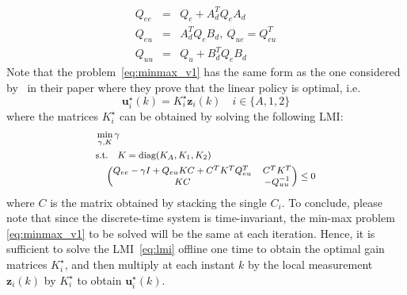 \documentclass{ifacconf}
\begin{document}
\begin{eqnarray}
    Q_{ee} &=& Q_e + A_d^T Q_e A_d \\
    Q_{eu} &=& A_d^T Q_e B_d,\ Q_{ue} = Q^T_{eu} \\
    Q_{uu} &=& Q_u + B_d^T Q_e B_d
\end{eqnarray}
Note that the problem~\eqref{eq:minmax_v1} has the same form as 
the one considered by~\cite{gattami_robust_2012} in their paper
where they prove that the linear policy is optimal, i.e.
\begin{equation}
    \boldsymbol{u}^\star_{i}(k) = K^\star_i \boldsymbol{z}_{i}(k) \quad i \in \{A,1,2\} 
\end{equation}
where the matrices $K^\star_i$ can be obtained by solving 
the following LMI:
\begin{equation}
    \small
    \begin{split}
        &\min_{\gamma , K} \gamma \\
        &\text{s.t.} \quad K = \text{diag}(K_A, K_1, K_2) \\
        &\quad \left(
            \begin{matrix}
                Q_{ee} - \gamma I + Q_{eu} K C + C^T K^T Q_{eu}^T & C^T K^T \\
                KC & -Q_{uu}^{-1}
            \end{matrix}
        \right) \leq 0
    \end{split}
    \label{eq:lmi}
\end{equation}
where $C$ is the matrix obtained by stacking the single $C_i$.
To conclude, please note that since the discrete-time system is time-invariant, 
the min-max problem \eqref{eq:minmax_v1} to be solved  will be the same at each iteration.
Hence, it is sufficient to solve the LMI~\eqref{eq:lmi} offline one time to obtain 
the optimal gain matrices $K^\star_i$, and then multiply at each instant $k$ 
by the local measurement $\boldsymbol{z}_{i}(k)$ by $K^\star_i$ to obtain $\boldsymbol{u}^\star_{i}(k)$.
\end{document}
